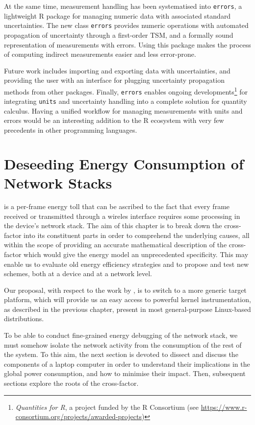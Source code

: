 \documentclass[twoside,nohyper]{tufte-book}
\theoremstyle{definition}
\theoremstyle{definition}
\theoremstyle{definition}
\theoremstyle{remark}
\begin{document}
At the same time, measurement handling has been systematised into
\texttt{errors}\cite[0pt]{contrib-03},
a lightweight R package for managing numeric data with associated
standard uncertainties. The new class \texttt{errors} provides numeric
operations with automated propagation of uncertainty through a
first-order TSM, and a formally sound representation of measurements
with errors. Using this package makes the process of computing indirect
measurements easier and less error-prone.

Future work includes importing and exporting data with uncertainties,
and providing the user with an interface for plugging uncertainty
propagation methods from other packages. Finally, \texttt{errors}
enables ongoing developments\footnote{\emph{Quantities for R}, a project
  funded by the R Consortium (see
  \url{https://www.r-consortium.org/projects/awarded-projects})} for
integrating \texttt{units} and uncertainty handling into a complete
solution for quantity calculus. Having a unified workflow for managing
measurements with units and errors would be an interesting addition to
the R ecosystem with very few precedents in other programming languages.

\chapter{Deseeding Energy Consumption of Network Stacks}\label{ch:04}

 is a per-frame energy toll that can be
ascribed to the fact that every frame received or transmitted through a
wireles interface requires some processing in the device's network
stack. The aim of this chapter is to break down the cross-factor into
its constituent parts in order to comprehend the underlying causes, all
within the scope of providing an accurate mathematical description of
the cross-factor which would give the energy model an unprecedented
specificity. This may enable us to evaluate old energy efficiency
strategies and to propose and test new schemes, both at a device and at
a network level.

Our proposal, with respect to the work by \citet{Serrano2014}, is to
switch to a more generic target platform, which will provide us an easy
access to powerful kernel instrumentation, as described in the previous
chapter, present in most general-purpose Linux-based distributions.

To be able to conduct fine-grained energy debugging of the network
stack, we must somehow isolate the network activity from the consumption
of the rest of the system. To this aim, the next section is devoted to
dissect and discuss the components of a laptop computer in order to
understand their implications in the global power consumption, and how
to minimise their impact. Then, subsequent sections explore the roots of
the cross-factor.
\end{document}

